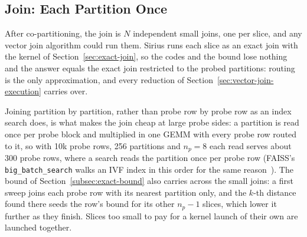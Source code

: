 \subsection{Join: Each Partition Once}\label{subsec:approx-join}

After co-partitioning, the join is $N$ independent small joins, one per slice, and any vector join algorithm could run them.
Sirius runs each slice as an exact join with the kernel of Section~\ref{sec:exact-join}, so the codes and the bound lose nothing and the answer equals the exact join restricted to the probed partitions: routing is the only approximation, and every reduction of Section~\ref{sec:vector-join-execution} carries over.

Joining partition by partition, rather than probe row by probe row as an index search does, is what makes the join cheap at large probe sides: a partition is read once per probe block and multiplied in one GEMM with every probe row routed to it, so with 10k probe rows, 256 partitions and $n_p=8$ each read serves about 300 probe rows, where a search reads the partition once per probe row (FAISS's \texttt{big\_batch\_search} walks an IVF index in this order for the same reason~\cite{DouzeFaiss24}).
The bound of Section~\ref{subsec:exact-bound} also carries across the small joins: a first sweep joins each probe row with its nearest partition only, and the $k$-th distance found there seeds the row's bound for its other $n_p-1$ slices, which lower it further as they finish.
Slices too small to pay for a kernel launch of their own are launched together.
